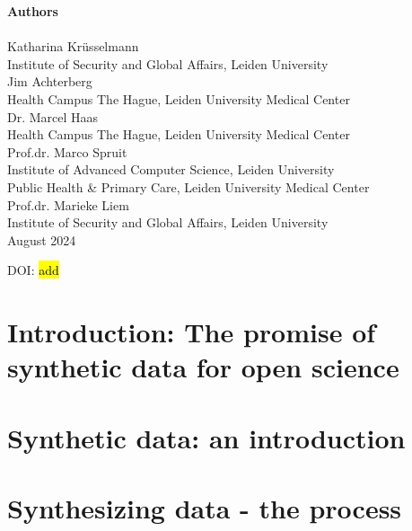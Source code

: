 \documentclass[12pt, twoside]{book}
\begin{document}
\textbf{Authors} \\\\
Katharina Krüsselmann  \\
Institute of Security and Global Affairs, Leiden University \\

Jim Achterberg   \\
Health Campus The Hague, Leiden University Medical Center \\

Dr. Marcel Haas  \\
Health Campus The Hague, Leiden University Medical Center \\

Prof.dr. Marco Spruit  \\
Institute of Advanced Computer Science, Leiden University \\
Public Health \& Primary Care, Leiden University Medical Center \\

Prof.dr. Marieke Liem  \\
Institute of Security and Global Affairs, Leiden University \\

August 2024

DOI: \hl{add}
\vspace*{\fill}

\newpage
\tableofcontents
    \thispagestyle{empty}

\cleardoublepage



\chapter{Introduction: The promise of synthetic data for open science}


\chapter{Synthetic data: an introduction}


\chapter{Synthesizing data - the process}

\end{document}
